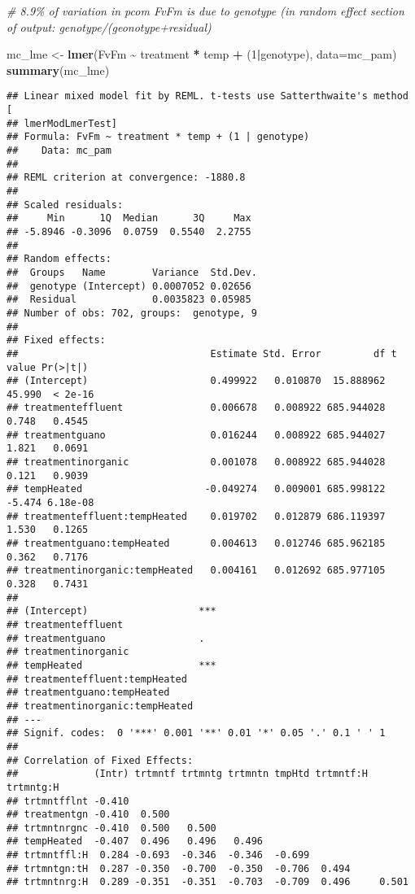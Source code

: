 \documentclass[
]{article}
\newenvironment{Shaded}{\begin{snugshade}}{\end{snugshade}}
\newcommand{\AttributeTok}[1]{\textcolor[rgb]{0.13,0.29,0.53}{#1}}
\newcommand{\CommentTok}[1]{\textcolor[rgb]{0.56,0.35,0.01}{\textit{#1}}}
\newcommand{\DecValTok}[1]{\textcolor[rgb]{0.00,0.00,0.81}{#1}}
\newcommand{\FunctionTok}[1]{\textcolor[rgb]{0.13,0.29,0.53}{\textbf{#1}}}
\newcommand{\NormalTok}[1]{#1}
\newcommand{\OtherTok}[1]{\textcolor[rgb]{0.56,0.35,0.01}{#1}}
\newcommand{\SpecialCharTok}[1]{\textcolor[rgb]{0.81,0.36,0.00}{\textbf{#1}}}
\begin{document}
\begin{Shaded}
\begin{Highlighting}[]
  \CommentTok{\# 8.9\% of variation in pcom FvFm is due to genotype (in random effect section of output: genotype/(geonotype+residual)}

\NormalTok{mc\_lme }\OtherTok{\textless{}{-}} \FunctionTok{lmer}\NormalTok{(FvFm }\SpecialCharTok{\textasciitilde{}}\NormalTok{ treatment }\SpecialCharTok{*}\NormalTok{ temp }\SpecialCharTok{+}\NormalTok{ (}\DecValTok{1}\SpecialCharTok{|}\NormalTok{genotype), }\AttributeTok{data=}\NormalTok{mc\_pam)}
\FunctionTok{summary}\NormalTok{(mc\_lme)}
\end{Highlighting}
\end{Shaded}

\begin{verbatim}
## Linear mixed model fit by REML. t-tests use Satterthwaite's method [
## lmerModLmerTest]
## Formula: FvFm ~ treatment * temp + (1 | genotype)
##    Data: mc_pam
## 
## REML criterion at convergence: -1880.8
## 
## Scaled residuals: 
##     Min      1Q  Median      3Q     Max 
## -5.8946 -0.3096  0.0759  0.5540  2.2755 
## 
## Random effects:
##  Groups   Name        Variance  Std.Dev.
##  genotype (Intercept) 0.0007052 0.02656 
##  Residual             0.0035823 0.05985 
## Number of obs: 702, groups:  genotype, 9
## 
## Fixed effects:
##                                 Estimate Std. Error         df t value Pr(>|t|)
## (Intercept)                     0.499922   0.010870  15.888962  45.990  < 2e-16
## treatmenteffluent               0.006678   0.008922 685.944028   0.748   0.4545
## treatmentguano                  0.016244   0.008922 685.944027   1.821   0.0691
## treatmentinorganic              0.001078   0.008922 685.944028   0.121   0.9039
## tempHeated                     -0.049274   0.009001 685.998122  -5.474 6.18e-08
## treatmenteffluent:tempHeated    0.019702   0.012879 686.119397   1.530   0.1265
## treatmentguano:tempHeated       0.004613   0.012746 685.962185   0.362   0.7176
## treatmentinorganic:tempHeated   0.004161   0.012692 685.977105   0.328   0.7431
##                                  
## (Intercept)                   ***
## treatmenteffluent                
## treatmentguano                .  
## treatmentinorganic               
## tempHeated                    ***
## treatmenteffluent:tempHeated     
## treatmentguano:tempHeated        
## treatmentinorganic:tempHeated    
## ---
## Signif. codes:  0 '***' 0.001 '**' 0.01 '*' 0.05 '.' 0.1 ' ' 1
## 
## Correlation of Fixed Effects:
##             (Intr) trtmntf trtmntg trtmntn tmpHtd trtmntf:H trtmntg:H
## trtmntfflnt -0.410                                                   
## treatmentgn -0.410  0.500                                            
## trtmntnrgnc -0.410  0.500   0.500                                    
## tempHeated  -0.407  0.496   0.496   0.496                            
## trtmntffl:H  0.284 -0.693  -0.346  -0.346  -0.699                    
## trtmntgn:tH  0.287 -0.350  -0.700  -0.350  -0.706  0.494             
## trtmntnrg:H  0.289 -0.351  -0.351  -0.703  -0.709  0.496     0.501
\end{verbatim}
\end{document}
